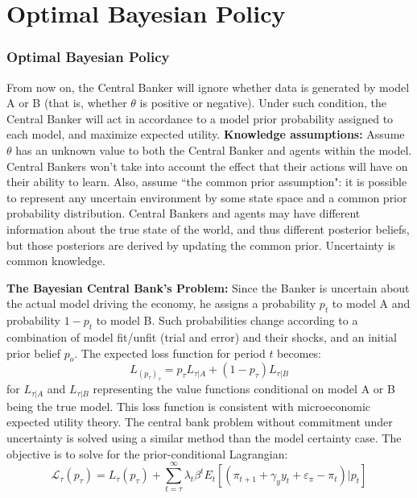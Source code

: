 \documentclass{beamer}
\begin{document}
\section{Optimal Bayesian Policy}
\begin{frame} 
\frametitle{Optimal Bayesian Policy} 
From now on, the Central Banker will ignore whether data is generated by
model A or B (that is, whether $\theta$ is positive or negative). Under such condition,
the Central Banker will act in accordance to a model prior probability assigned to each
model, and maximize expected utility.  
\newline
\newline
\textbf{Knowledge assumptions:} Assume $\theta$ has an unknown value to both
the Central Banker and agents within the model. 
Central Bankers won't take into account the
effect that their actions will have on their ability to learn.  
Also, assume ``the common prior assumption": it is possible to represent any
uncertain environment by some state space and a common prior probability
distribution. Central Bankers and agents may have different information about
the true state of the world, and thus different posterior beliefs, but those
posteriors are derived by updating the common prior. Uncertainty is common
knowledge.
\end{frame}

\begin{frame}
\textbf{The Bayesian Central Bank's Problem:} Since the Banker is uncertain
about the actual model driving the economy, he assigns a probability $p_t$ to
model A and probability $1-p_t$ to model B. Such probabilities change according
to a combination of model fit/unfit (trial and error) and their shocks, and an
initial prior belief $p_o$.
The expected loss function for period $t$ becomes:
\begin{equation}
L_(p_\tau)_\tau = p_\tau L_{\tau|A} + (1 - p_\tau) L_{\tau|B}
\end{equation}
for $L_{\tau|A} $ and $ L_{\tau|B}$ representing the value functions conditional
on model A or B being the true model. This loss function is consistent with
microeconomic expected utility theory. 
\newline
\newline
The central bank problem without commitment under uncertainty is solved using a
similar method than the model certainty case. The objective is to solve for the
prior-conditional Lagrangian:
\begin{equation}
\mathcal{L}_\tau (p_\tau) = L_\tau (p_\tau) + \sum_{t=\tau}^\infty \lambda_t \beta^t E_t [(\pi_{t+1} + \gamma_y y_t + \varepsilon_\pi - \pi_t)|p_t]
\end{equation}
\end{frame}
\end{document}
